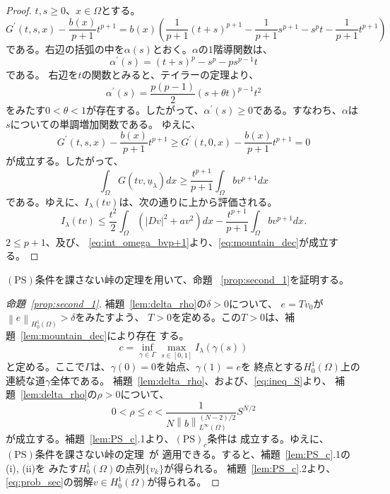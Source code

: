 \begin{proof}
 $t, s \geq 0$、$x \in \Omega$とする。
 \[
  G^\prime(t, s, x) - \frac{b(x)}{p+1} t^{p+1} = b(x) \left(
 \frac{1}{p+1}(t+s)^{p+1} - \frac{1}{p+1} s^{p+1} - s^p t -
 \frac{1}{p+1} t^{p+1} \right)
 \]
 である。右辺の括弧の中を$\alpha(s)$とおく。$\alpha$の$1$階導関数は、
 \[
  \alpha^\prime(s) = (t+s)^p - s^p - p s^{p-1} t
 \]
 である。
 右辺を$t$の関数とみると、テイラーの定理より、
 \[
  \alpha^\prime(s) = \frac{p(p-1)}{2}(s+ \theta t)^{p-1} t^2
 \]
 をみたす$0 < \theta < 1$が存在する。したがって、$\alpha^\prime(s)
 \geq 0$である。すなわち、$\alpha$は$s$についての単調増加関数である。
 ゆえに、
 \[
 G^\prime(t, s, x) - \frac{b(x)}{p+1} t^{p+1} \geq 
 G^\prime(t, 0, x) - \frac{b(x)}{p+1} t^{p+1} = 0
 \]
 が成立する。したがって、
 \[
  \int_\Omega G(tv, \underline{u}_\lambda) dx \geq
 \frac{t^{p+1}}{p+1} \int_\Omega b v^{p+1} dx
 \]
 である。ゆえに、$I_\lambda(tv)$は、次の通りに上から評価される。
 \[
  I_\lambda(tv) \leq \frac{t^2}{2} \int_\Omega \left( \lvert Dv
 \rvert^2 + av^2 \right) dx - \frac{t^{p+1}}{p+1} \int_\Omega bv^{p+1} dx.
 \]
 $2 \leq p+1$、及び、
 \eqref{eq:int_omega_bvp+1}より、\eqref{eq:mountain_dec}が成立する。\qedhere
\end{proof}

$(\mathrm{PS})$条件を課さない峠の定理を用いて、命題
~\ref{prop:second_1}を証明する。

\begin{proof}[命題~\ref{prop:second_1}]
 補題~\ref{lem:delta_rho}の$\delta > 0$について、
 $e = Tv_0$が$\left\| e \right\|_{H_0^1(\Omega)} > \delta$をみたすよう、
 $T > 0$を定める。この$T > 0$は、補題~\ref{lem:mountain_dec}により存在
 する。
 \[
   c = \inf_{\gamma \in \Gamma} \max_{s \in [0, 1]} I_\lambda ( \gamma
 (s ))
 \]
 と定める。ここで$\Gamma$は、$\gamma(0) = 0$を始点、$\gamma(1) = e$を
 終点とする$H_0^1(\Omega)$上の連続な道$\gamma$全体である。
 補題~\ref{lem:delta_rho}、および、\eqref{eq:ineq_S}より、
 補題~\ref{lem:delta_rho}の$\rho > 0$について、
 \[
  0 < \rho \leq c <    \frac{1}{N\left\| b
             \right\|_{L^\infty(\Omega)} ^{(N-2)/2}} S^{N/2} 
 \]
 が成立する。補題~\ref{lem:PS_c}.1より、$(\mathrm{PS})_c$条件は
 成立する。ゆえに、
 $(\mathrm{PS})$条件を課さない峠の定理~\cite{MR0370183}が
 適用できる。すると、補題~\ref{lem:PS_c}.1の(i), (ii)を
 みたす$H_0^1(\Omega)$の点列$\{ v_k \}$が得られる。
 補題~\ref{lem:PS_c}.2より、\ref{eq:prob_sec}の弱解$v \in
 H_0^1(\Omega)$が得られる。\qedhere
\end{proof}

